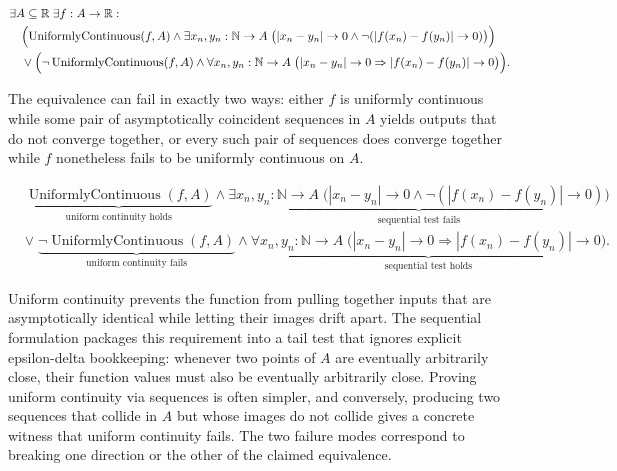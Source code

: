 \begin{remark*}
\[
\begin{aligned}
&\exists A \subseteq \mathbb{R}\;\exists f:A \to \mathbb{R}:\\
&\quad \Bigl(\operatorname{UniformlyContinuous}(f,A) \land \exists x_n,y_n:\mathbb{N}\to A\;
\bigl(|x_n - y_n| \to 0 \land \neg(|f(x_n) - f(y_n)| \to 0)\bigr)\Bigr)\\
&\quad \lor \Bigl(\neg \operatorname{UniformlyContinuous}(f,A) \land
\forall x_n,y_n:\mathbb{N}\to A\;
\bigl(|x_n - y_n| \to 0 \Rightarrow |f(x_n) - f(y_n)| \to 0\bigr)\Bigr).
\end{aligned}
\]
\end{remark*}

\begin{remark*}
The equivalence can fail in exactly two ways: either $f$ is uniformly continuous while some pair of asymptotically coincident sequences in $A$ yields outputs that do not converge together, or every such pair of sequences does converge together while $f$ nonetheless fails to be uniformly continuous on $A$.
\end{remark*}

\begin{remark*}
\[
\begin{aligned}
&\underbrace{\operatorname{UniformlyContinuous}(f,A)}_{\text{uniform continuity holds}}
\land
\underbrace{\exists x_n,y_n:\mathbb{N}\to A\;
\bigl(|x_n - y_n| \to 0 \land \neg(|f(x_n) - f(y_n)| \to 0)\bigr)}_{\text{sequential test fails}}\\
&\lor\;
\underbrace{\neg \operatorname{UniformlyContinuous}(f,A)}_{\text{uniform continuity fails}}
\land
\underbrace{\forall x_n,y_n:\mathbb{N}\to A\;
\bigl(|x_n - y_n| \to 0 \Rightarrow |f(x_n) - f(y_n)| \to 0\bigr)}_{\text{sequential test holds}}.
\end{aligned}
\]
\end{remark*}

\begin{remark*}[Interpretation]
Uniform continuity prevents the function from pulling together inputs that are asymptotically identical while letting their images drift apart. The sequential formulation packages this requirement into a tail test that ignores explicit epsilon-delta bookkeeping: whenever two points of $A$ are eventually arbitrarily close, their function values must also be eventually arbitrarily close. Proving uniform continuity via sequences is often simpler, and conversely, producing two sequences that collide in $A$ but whose images do not collide gives a concrete witness that uniform continuity fails. The two failure modes correspond to breaking one direction or the other of the claimed equivalence.
\end{remark*}

